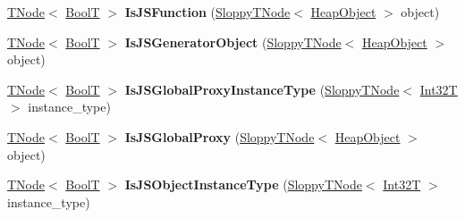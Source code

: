 \begin{DoxyCompactItemize}
\item 
\mbox{\label{classv8_1_1internal_1_1CodeStubAssembler_a346d3fbc1f3d8c700fb4686c37813941}} 
\mbox{\hyperlink{classv8_1_1internal_1_1compiler_1_1TNode}{T\+Node}}$<$ \mbox{\hyperlink{structv8_1_1internal_1_1BoolT}{BoolT}} $>$ {\bfseries Is\+J\+S\+Function} (\mbox{\hyperlink{classv8_1_1internal_1_1compiler_1_1SloppyTNode}{Sloppy\+T\+Node}}$<$ \mbox{\hyperlink{classv8_1_1internal_1_1HeapObject}{Heap\+Object}} $>$ object)
\item 
\mbox{\label{classv8_1_1internal_1_1CodeStubAssembler_a87b4f8124632fb3f0a5c5cbb302165c6}} 
\mbox{\hyperlink{classv8_1_1internal_1_1compiler_1_1TNode}{T\+Node}}$<$ \mbox{\hyperlink{structv8_1_1internal_1_1BoolT}{BoolT}} $>$ {\bfseries Is\+J\+S\+Generator\+Object} (\mbox{\hyperlink{classv8_1_1internal_1_1compiler_1_1SloppyTNode}{Sloppy\+T\+Node}}$<$ \mbox{\hyperlink{classv8_1_1internal_1_1HeapObject}{Heap\+Object}} $>$ object)
\item 
\mbox{\label{classv8_1_1internal_1_1CodeStubAssembler_a459082c9b5bd1e828b166ae8f79fc570}} 
\mbox{\hyperlink{classv8_1_1internal_1_1compiler_1_1TNode}{T\+Node}}$<$ \mbox{\hyperlink{structv8_1_1internal_1_1BoolT}{BoolT}} $>$ {\bfseries Is\+J\+S\+Global\+Proxy\+Instance\+Type} (\mbox{\hyperlink{classv8_1_1internal_1_1compiler_1_1SloppyTNode}{Sloppy\+T\+Node}}$<$ \mbox{\hyperlink{structv8_1_1internal_1_1Int32T}{Int32T}} $>$ instance\+\_\+type)
\item 
\mbox{\label{classv8_1_1internal_1_1CodeStubAssembler_a445709bfa7e83684e8fd618c60e82e7f}} 
\mbox{\hyperlink{classv8_1_1internal_1_1compiler_1_1TNode}{T\+Node}}$<$ \mbox{\hyperlink{structv8_1_1internal_1_1BoolT}{BoolT}} $>$ {\bfseries Is\+J\+S\+Global\+Proxy} (\mbox{\hyperlink{classv8_1_1internal_1_1compiler_1_1SloppyTNode}{Sloppy\+T\+Node}}$<$ \mbox{\hyperlink{classv8_1_1internal_1_1HeapObject}{Heap\+Object}} $>$ object)
\item 
\mbox{\label{classv8_1_1internal_1_1CodeStubAssembler_a563f8a4a3321e16fe264e94b1dcd8dac}} 
\mbox{\hyperlink{classv8_1_1internal_1_1compiler_1_1TNode}{T\+Node}}$<$ \mbox{\hyperlink{structv8_1_1internal_1_1BoolT}{BoolT}} $>$ {\bfseries Is\+J\+S\+Object\+Instance\+Type} (\mbox{\hyperlink{classv8_1_1internal_1_1compiler_1_1SloppyTNode}{Sloppy\+T\+Node}}$<$ \mbox{\hyperlink{structv8_1_1internal_1_1Int32T}{Int32T}} $>$ instance\+\_\+type)

\end{DoxyCompactItemize}
